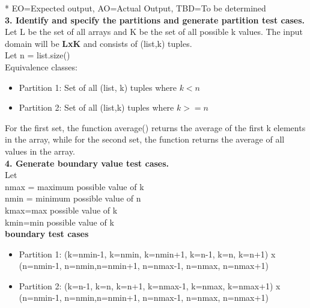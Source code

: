 \documentclass[12pt,letterpaper,titlepage,en-US]{article}
\begin{document}
* EO=Expected output, AO=Actual Output, TBD=To be determined \\


\textbf{3. Identify and specify the partitions and generate partition test cases.}\\
Let L be the set of all arrays and K be the set of all possible k values.
The input domain will be \textbf{LxK} and consists of (list,k) tuples. \\

Let n = list.size()\\

Equivalence classes: 

\begin{itemize}[noitemsep,nolistsep]


\item Partition 1: Set of all (list, k) tuples where $k<n$

\item Partition 2: Set of all (list,k) tuples where $k>=n$\\
\end{itemize}
For the first set, the function average() returns the average of the first k elements in the array, while for the second set, the function returns the average of all values in the array.\\



 \textbf{4. Generate boundary value test cases.}\\
 Let \\
 nmax = maximum possible value of k\\
 nmin = minimum possible value of n \\
 kmax=max possible value of k\\
 kmin=min possible value of k\\
 
 \textbf{boundary test cases}
\begin{itemize}[noitemsep,nolistsep]


\item Partition 1: (k=nmin-1, k=nmin, k=nmin+1, k=n-1, k=n, k=n+1)
x (n=nmin-1, n=nmin,n=nmin+1, n=nmax-1, n=nmax, n=nmax+1)
\item Partition 2:  (k=n-1, k=n, k=n+1, k=nmax-1, k=nmax, k=nmax+1)
x (n=nmin-1, n=nmin,n=nmin+1, n=nmax-1, n=nmax, n=nmax+1)\\

\end{itemize}

  
\end{document}
